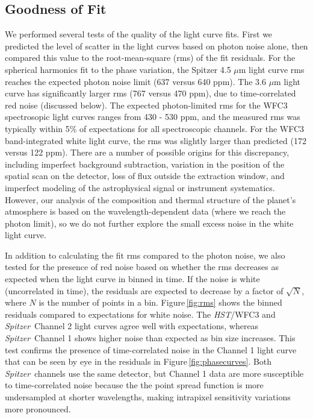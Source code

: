 \documentclass[twocolumn, trackchanges]{aastex61}
\newcommand{\project}[1]{\textsl{#1}}
\newcommand{\HST}{\project{HST}}
\newcommand{\Spitzer}{\project{Spitzer}}
\begin{document}
\subsection{Goodness of Fit}
\label{sec:fitquality}
We performed several tests of the quality of the light curve fits.  First we predicted the level of scatter in the light curves based on photon noise alone, then compared this value to the root-mean-square (rms) of the fit residuals.  For the spherical harmonics fit to the phase variation, the Spitzer 4.5 $\mu$m light curve rms reaches the expected photon noise limit (637 versus 640 ppm). The 3.6 $\mu$m light curve has significantly larger rms (767 versus 470 ppm), due to time-correlated red noise (discussed below). The expected photon-limited rms for the WFC3 spectrosopic light curves ranges from 430 - 530 ppm, and the measured rms was typically within 5\% of expectations for all spectroscopic channels.  For the WFC3 band-integrated white light curve, the rms was slightly larger than predicted (172 versus 122 ppm). There are a number of possible origins for this discrepancy, including imperfect background subtraction, variation in the position of the spatial scan on the detector, loss of flux outside the extraction window, and imperfect modeling of the astrophysical signal or instrument systematics. However, our analysis of the composition and thermal structure of the planet's atmosphere is based on the wavelength-dependent data (where we reach the photon limit), so we do not further explore the small excess noise in the white light curve. 


In addition to calculating the fit rms compared to the photon noise, we also tested for the presence of red noise based on whether the rms decreases as expected when the light curve in binned in time.  If the noise is white (uncorrelated in time), the residuals are expected to decrease by a factor of $\sqrt{N}$, where $N$ is the number of points in a bin. Figure\,\ref{fig:rms} shows the binned residuals compared to expectations for white noise. The \HST/WFC3 and \Spitzer\ Channel 2 light curves agree well with expectations, whereas \Spitzer\ Channel 1 shows higher noise than expected as bin size increases. This test confirms the presence of time-correlated noise in the Channel 1 light curve that can be seen by eye in the residuals in Figure\,\ref{fig:phasecurves}. Both \Spitzer\ channels use the same detector, but Channel 1 data are more susceptible to time-correlated noise because the the point spread function is more undersampled at shorter wavelengths, making intrapixel sensitivity variations more pronounced.
\end{document}
